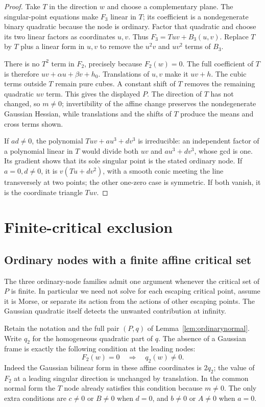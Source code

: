 \documentclass[11pt]{article}
\theoremstyle{definition}\newtheorem{definition}[theorem]{Definition}
\theoremstyle{remark}\newtheorem{remark}[theorem]{Remark}
\begin{document}
\begin{proof}
Take $T$ in the direction $w$ and choose a complementary plane.
The singular-point equations make $F_3$ linear in $T$; its
coefficient is a nondegenerate binary quadratic because the node
is ordinary. Factor that quadratic and choose its two linear
factors as coordinates $u,v$. Thus $F_3=Tuv+B_3(u,v)$.
Replace $T$ by $T$ plus a linear form in $u,v$ to remove the
$u^2v$ and $uv^2$ terms of $B_3$.

There is no $T^2$ term in $F_2$, precisely because $F_2(w)=0$.
The full coefficient of $T$ is therefore
$uv+\alpha u+\beta v+h_0$. Translations of $u,v$ make it $uv+h$.
The cubic terms outside $T$ remain pure cubes. A constant shift
of $T$ removes the remaining quadratic $uv$ term. This gives the
displayed $P$. The direction of $T$ has not changed, so $m\ne0$;
invertibility of the affine change preserves the nondegenerate
Gaussian Hessian, while translations and the shifts of $T$ produce
the means and cross terms shown.

If $ad\ne0$, the polynomial $Tuv+a u^3+d v^3$ is irreducible:
an independent factor of a polynomial linear in $T$ would divide
both $uv$ and $a u^3+d v^3$, whose gcd is one. Its gradient shows
that its sole singular point is the stated ordinary node. If
$a=0,d\ne0$, it is $v(Tu+d v^2)$, with a smooth conic meeting
the line transversely at two points; the other one-zero case is
symmetric. If both vanish, it is the coordinate triangle $Tuv$.
\end{proof}

\section{Finite-critical exclusion}
\subsection{Ordinary nodes with a finite affine critical set}
\label{sec:ordinaryfinite}

The three ordinary-node families admit one argument whenever the
critical set of $P$ is finite. In particular we need not solve for
each escaping critical point, assume it is Morse, or separate its
action from the actions of other escaping points. The Gaussian
quadratic itself detects the unwanted contribution at infinity.

Retain the notation and the full pair $(P,q)$ of
Lemma~\ref{lem:ordinarynormal}. Write $q_2$ for the homogeneous
quadratic part of $q$. The absence of a Gaussian frame is exactly
the following condition at the leading nodes:
\begin{equation}\label{eq:nodenoframe}
 F_2(w)=0\quad\Longrightarrow\quad q_2(w)\ne0.
\end{equation}
Indeed the Gaussian bilinear form in these affine coordinates is
$2q_2$; the value of $F_2$ at a leading singular direction is
unchanged by translation. In the common normal form the $T$ node
already satisfies this condition because $m\ne0$. The only extra
conditions are $c\ne0$ or $B\ne0$ when $d=0$, and $b\ne0$ or
$A\ne0$ when $a=0$.
\end{document}
